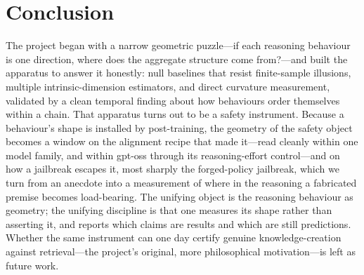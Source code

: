 \documentclass[10pt]{article}
\begin{document}
\section{Conclusion}
\label{sec:conclusion}

The project began with a narrow geometric puzzle---if each reasoning behaviour is one
direction, where does the aggregate structure come from?---and built the apparatus to
answer it honestly: null baselines that resist finite-sample illusions, multiple
intrinsic-dimension estimators, and direct curvature measurement, validated by a
clean temporal finding about how behaviours order themselves within a chain. That
apparatus turns out to be a safety instrument. Because a behaviour's shape is
installed by post-training, the geometry of the safety object becomes a window on the
alignment recipe that made it---read cleanly within one model family, and within
gpt-oss through its reasoning-effort control---and on how a jailbreak escapes it, most
sharply the forged-policy jailbreak, which we turn from an anecdote into a measurement
of where in the reasoning a fabricated premise becomes load-bearing. The unifying
object is the reasoning behaviour as geometry; the unifying discipline is that one
measures its shape rather than asserting it, and reports which claims are results and
which are still predictions. Whether the same instrument can one day certify genuine
knowledge-creation against retrieval---the project's original, more philosophical
motivation---is left as future work.

\small


\end{document}
